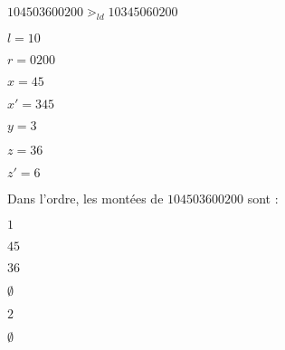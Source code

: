 \begin{example}[Définition 16 : $n = 5$]
    $104503600200 \gtrdot_{ld} 10345060200$
    ~\\
    \begin{itemize*}
        \item $l = 10$
        \item $r = 0200$
        \item $x = 45$
        \item $x' = 345$
        \item $y = 3$
        \item $z = 36$
        \item $z' = 6$
    \end{itemize*}
    
\end{example}

\begin{example}[Définition 17 : $n = 5$]
    Dans l'ordre, les montées de $104503600200$ sont :\\
    \begin{itemize*}
        \item $1$
        \item $45$
        \item $36$
        \item $\emptyset$
        \item $2$
        \item $\emptyset$
    \end{itemize*}
\end{example}